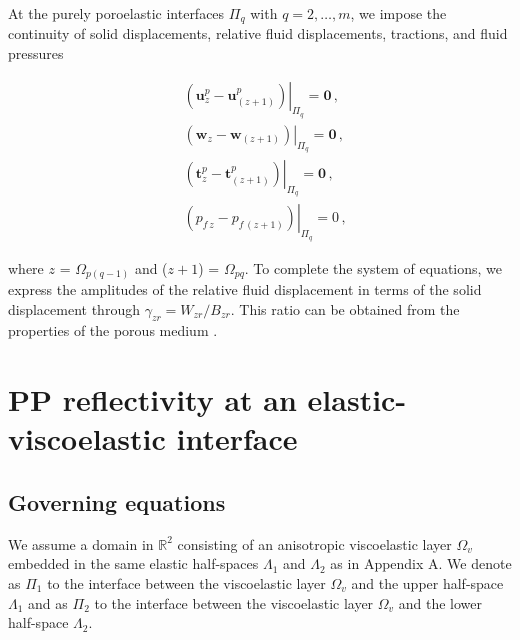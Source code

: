 \documentclass[draft]{agujournal2019}
\begin{document}
At the purely poroelastic interfaces $\Pi_q$ with $q=2,\dots,m$, we impose the continuity of solid displacements, relative fluid displacements, tractions, and fluid pressures \cite{Deresiewicz1963}
\begin{linenomath*}
\begin{equation}\label{Eq.19}
\begin{split}
&  \left. \left( \bm{u}_z^p -  \bm{u}_{(z+1)}^p \right) \right \rvert_{\Pi_q} = \bm{0} \,, \\
&  \left. \left(  \bm{w}_z -  \bm{w}_{(z+1)} \right) \right \rvert_{\Pi_q} = \bm{0} \,, \\
& \left . \left(  \bm{t}_z^p  - \bm{t}_{(z+1)}^p \right) \right \rvert_{\Pi_q}= \bm{0} \,,\\
&  \left. \left(  p_{f\,z} -  p_{f\, (z+1)} \right) \right \rvert_{\Pi_q} = 0 \,,
\end{split}
\end{equation}
\end{linenomath*}
where $z$ = $\Omega_{p(q-1)}$ and ($z+1$) = $\Omega_{pq}$. 
To complete the system of equations, we express the amplitudes of the relative fluid displacement in terms of the solid displacement through
 $\gamma_{zr}=W_{zr}/B_{zr}$. This ratio can be  obtained from the properties of the porous medium \cite{Barbosa2016}.


\section{PP reflectivity at an elastic-viscoelastic interface}
\subsection{Governing equations}
We assume a  domain in $\mathbb R^2$ consisting of an anisotropic viscoelastic layer $\Omega_v$  
embedded in the same elastic half-spaces $\Lambda_1$ and $\Lambda_2$ as in Appendix A. We denote as $\Pi_1$ to the interface between the viscoelastic layer $\Omega_v$ and the upper half-space $\Lambda_1$ and as $\Pi_2$ to the interface between the viscoelastic layer $\Omega_v$ and the lower half-space $\Lambda_2$.
 
\end{document}
